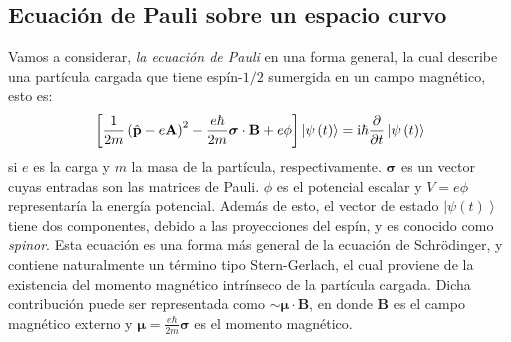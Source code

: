 \documentclass[superscriptaddress,onecolumn,aps,preprint,showpacs,nofootinbib,pra,11pt]{revtex4-2}
\begin{document}
\begin{normalsize}
\subsection{Ecuación de Pauli sobre un espacio curvo}

Vamos a considerar, \textit{la ecuación de Pauli} en una forma general, la cual describe una partícula cargada que tiene espín-$1/2$ sumergida en un campo magnético, esto es:
\[
\left[\frac{1}{2m}\left(\hat{{\bf p}}-e {\bf A}\right)^{2}-\frac{e \hbar}{2m}\bm{\sigma}\cdot{\bf B}+ e \phi\right] \left|\psi \left(t \right)\right\rangle  =\mathrm{i}\hbar\frac{\partial}{\partial t}\left|\psi \left(t \right)\right\rangle 
\]
si $e$ es la carga y $m$ la masa de la partícula, respectivamente. $\bm{\sigma}$ es un vector cuyas entradas son las matrices de Pauli. $\phi$ es el potencial escalar y $V = e \phi$ representaría la energía potencial. Además de esto, el vector de estado $\left|\psi \left(t \right)\right\rangle $ tiene dos componentes, debido a las proyecciones del espín,  y es conocido como \textit{spinor}. Esta ecuación es una forma más general de la ecuación de Schrödinger, y contiene naturalmente un término tipo Stern-Gerlach, el cual proviene de la existencia del momento magnético intrínseco de la partícula cargada. Dicha contribución puede ser representada como $\sim {\bm \mu}\cdot \mathbf{B}$, en donde $\mathbf{B}$ es el campo magnético externo y ${\bm \mu} = \frac{e \hbar}{2m}\bm{\sigma}$ es el momento magnético.


\end{normalsize}
\end{document}
